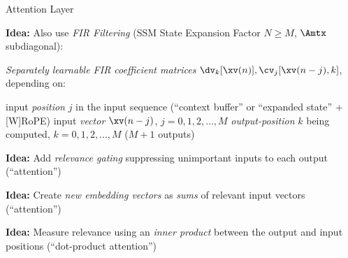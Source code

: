 \begin{slide}[\slideopts,toc={Attention}]{Attention Layer}

\vspace{-1em}

\textbf{Idea:} Also use \emph{FIR Filtering} (SSM State Expansion Factor $N\ge M$, $\Amtx$ subdiagonal):



\vspace{-1em}

\emph{Separately learnable FIR coefficient matrices} $\dv_k[\xv(n)], \cv_j[\xv(n-j),k]$, depending on:
  \begin{enumerate}
    \mpitem input \emph{position} $j$ in the input sequence (``context buffer'' or ``expanded state'' + [W]RoPE)
    \mpitem input \emph{vector} $\xv(n-j)$,\; $j=0,1,2,\dots,M$
    \mpitem \emph{output-position} $k$ being computed,\; $k=0,1,2,\dots,M$ ($M+1$ outputs)
  \end{enumerate}

\maybepause
\textbf{Idea:} Add \emph{relevance gating} suppressing unimportant inputs to each output (``attention'')

\vspace{0.2em}

\maybepause
\textbf{Idea:} Create \emph{new embedding vectors} as \emph{sums} of relevant input vectors (``attention'')

\vspace{0.2em}

\maybepause
\textbf{Idea:} Measure relevance using an \emph{inner product} between the output and input positions (``dot-product attention'')
\end{slide}

